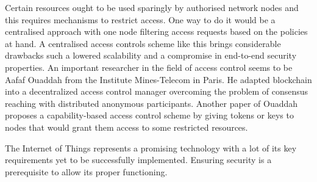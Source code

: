 \documentclass[14]{article}
\begin{document}
Certain resources ought to be used sparingly by authorised network nodes and this requires mechanisms to restrict access. One way to do it would be a centralised approach\cite{hernandez2013distributed} with one node filtering access requests based on the policies at hand. A centralised access controls scheme like this brings considerable drawbacks\cite{ouaddah2017towards} such a lowered scalability and a compromise in end-to-end security properties. An important researcher in the field of access control seems to be Aafaf Ouaddah from the Institute Mines-Telecom in Paris. He adapted blockchain\cite{ouaddah2016fairaccess} into a decentralized access control manager overcoming the problem of consensus reaching with distributed anonymous participants. Another paper\cite{ouaddah2017access} of Ouaddah proposes a capability-based access control scheme by giving tokens or keys to nodes that would grant them access to some restricted resources. 
\newline


The Internet of Things represents a promising technology with a lot of its key requirements yet to be successfully implemented\cite{borgia2014internet}. Ensuring security is a prerequisite to allow its proper functioning. 

\newpage
%

	
\end{document}

